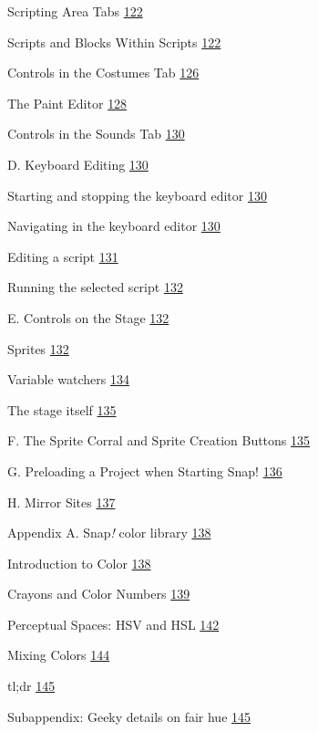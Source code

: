 Scripting Area Tabs \hyperref[scripting-area-tabs]{122}

Scripts and Blocks Within Scripts
\hyperref[scripts-and-blocks-within-scripts]{122}

Controls in the Costumes Tab
\hyperref[controls-in-the-costumes-tab]{126}

The Paint Editor \hyperref[the-paint-editor]{128}

Controls in the Sounds Tab \hyperref[controls-in-the-sounds-tab]{130}

D. Keyboard Editing \hyperref[keyboard-editing]{130}

Starting and stopping the keyboard editor
\hyperref[starting-and-stopping-the-keyboard-editor]{130}

Navigating in the keyboard editor
\hyperref[navigating-in-the-keyboard-editor]{130}

Editing a script \hyperref[editing-a-script]{131}

Running the selected script \hyperref[running-the-selected-script]{132}

E. Controls on the Stage \hyperref[controls-on-the-stage]{132}

Sprites \hyperref[sprites]{132}

Variable watchers
\hyperref[macintosh-hdusersbhdesktopwatcher-menu.pngvariable-watchers]{134}

The stage itself \hyperref[the-stage-itself]{135}

F. The Sprite Corral and Sprite Creation Buttons
\hyperref[the-sprite-corral-and-sprite-creation-buttons]{135}

G. Preloading a Project when Starting Snap!
\hyperref[preloading-a-project-when-starting-snap]{136}

H. Mirror Sites \hyperref[mirror-sites]{137}

Appendix A. Snap\emph{!} color library
\hyperref[appendix-a.-snap-color-library]{138}

Introduction to Color \hyperref[introduction-to-color]{138}

Crayons and Color Numbers \hyperref[crayons-and-color-numbers]{139}

Perceptual Spaces: HSV and HSL
\hyperref[perceptual-spaces-hsv-and-hsl]{142}

Mixing Colors \hyperref[mixing-colors]{144}

tl;dr \hyperref[tldr]{145}

Subappendix: Geeky details on fair hue
\hyperref[subappendix-geeky-details-on-fair-hue]{145}


